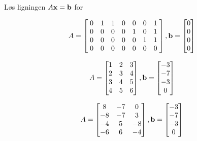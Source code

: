 \begin{oppgave}
Løs ligningen $A\mathbf{x}=\mathbf{b}$ for 

\begin{punkt}
$$A=
\begin{bmatrix}
\;0 & 1 & 1 & 0 & 0 & 0 & 1\;\\
\;0 & 0 & 0 & 0 & 1 & 0 & 1\;\\
\;0 & 0 & 0 & 0 & 0 & 1 & 1\;\\
\;0 & 0 & 0 & 0 & 0 & 0 & 0\;
\end{bmatrix}, \mathbf{b}=
\begin{bmatrix}
0  \\
0 \\
0 \\
0
\end{bmatrix}
$$
\end{punkt}

\begin{punkt}

$$A=
\begin{bmatrix}
1 & 2 & 3\\
2 & 3 & 4\\
3 & 4 & 5\\
4 & 5 & 6
\end{bmatrix}, \mathbf{b}=
\begin{bmatrix}
-3  \\
-7 \\
-3 \\
0
\end{bmatrix}
$$

\end{punkt}


\begin{punkt}
	
	$$A=
	\begin{bmatrix}
	8  & -7 & 0 \\
	-8 & -7 & 3 \\
	-4 & 5  & -8\\
	-6 & 6  & -4
	\end{bmatrix}, \mathbf{b}=
	\begin{bmatrix}
	-3  \\
	-7 \\
	-3 \\
	0
	\end{bmatrix}
	$$
	
\end{punkt}

\end{oppgave}



